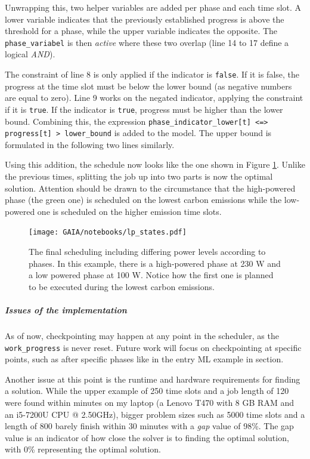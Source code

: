 Unwrapping this, two helper variables are added per phase and each time slot. 
A lower variable indicates that the previously established progress is above the threshold for a phase, while the upper variable indicates the opposite. 
The \verb|phase_variabel| is then \emph{active} where these two overlap (line 14 to 17 define a logical \emph{AND}).

The constraint of line 8 is only applied if the indicator is \verb|false|.
If it is false, the progress at the time slot must be below the lower bound (as negative numbers are equal to zero).
Line 9 works on the negated indicator, applying the constraint if it is \verb|true|. 
If the indicator is \verb|true|, progress must be higher than the lower bound. 
Combining this, the expression \verb|phase_indicator_lower[t] <=> progress[t] > lower_bound| is added to the model. 
The upper bound is formulated in the following two lines similarly.

Using this addition, the schedule now looks like the one shown in Figure \ref{fig:lp_states}. 
Unlike the previous times, splitting the job up into two parts is now the optimal solution. 
Attention should be drawn to the circumstance that the high-powered phase (the green one) is scheduled on the lowest carbon emissions while the low-powered one is scheduled on the higher emission time slots.

\begin{figure}
    \texttt{[image: GAIA/notebooks/lp\_states.pdf]}
    \caption{The final scheduling including differing power levels according to phases. In this example, there is a high-powered phase at 230 W and a low powered phase at 100 W. Notice how the first one is planned to be executed during the lowest carbon emissions.}
    \label{fig:lp_states}
\end{figure}

\subparagraph{Issues of the implementation}

As of now, checkpointing may happen at any point in the scheduler, as the \verb|work_progress| is never reset. 
Future work will focus on checkpointing at specific points, such as after specific phases like in the entry ML example in section.

Another issue at this point is the runtime and hardware requirements for finding a solution.
While the upper example of 250 time slots and a job length of 120 were found within minutes on my laptop (a Lenovo T470 with 8 GB RAM and an i5-7200U CPU @ 2.50GHz), bigger problem sizes such as 5000 time slots and a length of 800 barely finish within 30 minutes with a \emph{gap} value of 98\%.
The gap value is an indicator of how close the solver is to finding the optimal solution, with 0\% representing the optimal solution.

